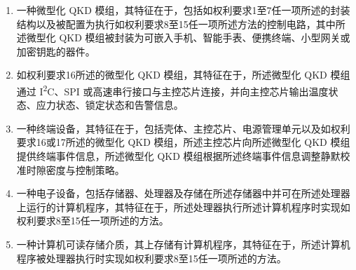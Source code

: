 \documentclass[12pt,a4paper]{article}
\begin{document}
\begin{enumerate}[
    label=\arabic*.,
    leftmargin=0pt,
    itemindent=2em,
    labelsep=0.5em,
    align=left,
    itemsep=0.6em,
    topsep=0pt
]
\item 一种微型化 QKD 模组，其特征在于，包括如权利要求1至7任一项所述的封装结构以及被配置为执行如权利要求8至15任一项所述方法的控制电路，其中所述微型化 QKD 模组被封装为可嵌入手机、智能手表、便携终端、小型网关或加密钥匙的器件。

\item 如权利要求16所述的微型化 QKD 模组，其特征在于，所述微型化 QKD 模组通过 I\textsuperscript{2}C、SPI 或高速串行接口与主控芯片连接，并向主控芯片输出温度状态、应力状态、锁定状态和告警信息。

\item 一种终端设备，其特征在于，包括壳体、主控芯片、电源管理单元以及如权利要求16或17所述的微型化 QKD 模组，所述主控芯片向所述微型化 QKD 模组提供终端事件信息，所述微型化 QKD 模组根据所述终端事件信息调整静默校准时隙密度与控制策略。

\item 一种电子设备，包括存储器、处理器及存储在所述存储器中并可在所述处理器上运行的计算机程序，其特征在于，所述处理器执行所述计算机程序时实现如权利要求8至15任一项所述的方法。

\item 一种计算机可读存储介质，其上存储有计算机程序，其特征在于，所述计算机程序被处理器执行时实现如权利要求8至15任一项所述的方法。

\end{enumerate}
\end{document}
